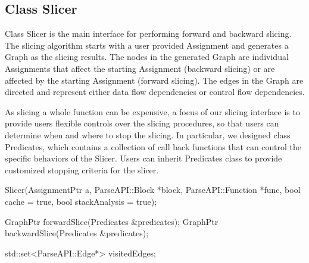 \subsection{Class Slicer}
\label{sec:slicing}


Class Slicer is the main interface for performing forward and backward slicing.
The slicing algorithm starts with a user provided Assignment and generates a
Graph as the slicing results. The nodes in the generated Graph are individual
Assignments that affect the starting Assignment (backward slicing) or are
affected by the starting Assignment (forward slicing). The edges in the Graph
are directed and represent either data flow dependencies or control flow
dependencies. 

As slicing a whole function can be expensive, a focus of our slicing interface
is to provide users flexible controls over the slicing procedures, so that users
can determine when and where to stop the slicing. In particular, we designed
class Predicates, which contains a collection of call back functions that can
control the specific behaviors of the Slicer. Users can inherit Predicates class
to provide customized stopping criteria for the slicer.

\begin{apient}
Slicer(AssignmentPtr a,
       ParseAPI::Block *block,
       ParseAPI::Function *func,
       bool cache = true,
       bool stackAnalysis = true);
\end{apient}

\begin{apient}
GraphPtr forwardSlice(Predicates &predicates);
GraphPtr backwardSlice(Predicates &predicates);
\end{apient}

\begin{apient}
std::set<ParseAPI::Edge*> visitedEdges;
\end{apient}

